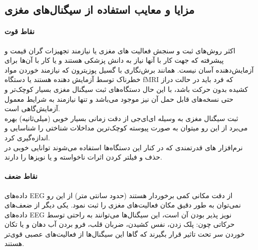 \subsection{مزایا و معایب استفاده از سیگنال‌های مغزی}
\label{bbc:eeg_procon}
\paragraph{نقاط قوت}
اکثر روش‌های ثبت و سنجش فعالیت های مغزی یا نیازمند تجهیزات گران قیمت و پیشرفته که جهت کار با آنها نیاز به دانش پزشکی هستند و یا کار با آن‌ها برای آزمایش‌دهنده آسان نیست. همانند برش‌نگاری با گسیل پوزیترون
که نیازمند خوردن مواد خطرناک توسط آزمایش دهنده هستند یا دستگاه fMRI که فرد باید در حالت دراز کشیده بدون حرکت باشد، با این حال دستگاه‌های ثبت سیگنال مغزی بسیار کوچک‌‌تر و حتی نسخه‌های قابل حمل آن نیز موجود می‌باشد و تنها نیازمند به شرایط  معمول آزمایش‌گاهی است.
\\
ثبت سیگنال مغزی به وسیله ای‌ای‌جی از دقت زمانی بسیار خوبی (میلی‌ثانیه) بهره می‌برد از این رو میتوان به صورت پیوسته کوچک‌ترین مداخلات شناختی را شناسایی و اندازه‌گیری کرد.
\\
نرم‌افزار های قدرتمندی که در کنار این دستگاه‌ها استفاده می‌شوند توانایی خوبی در حذف و فیلتر کردن اثرات ناخواسته و یا نویز‌ها را دارند.
\paragraph{نقاط ضعف}
داده‌های
EEG
از دقت مکانی کمی برخوردار هستند (حدود سانتی متر) از این رو نمی‌توان به طور دقیق مکان فعالیت‌های مغزی را ثبت نمود. یکی دیگر از ضعف‌های داده‌های 
EEG
 نویز پذیر بودن آن است، این سیگنال‌ها می‌توانند به راحتی توسط حرکاتی چون: پلک زدن، نفس کشیدن، ضربان قلب، فرو بردن آب دهان و یا تکان خوردن سر تحت تاثیر قرار بگیرند که گاها این سیگنال‌ها از فعالیت‌های عصبی قوی‌تر هستند.
 \cite{antonenko2010using}
